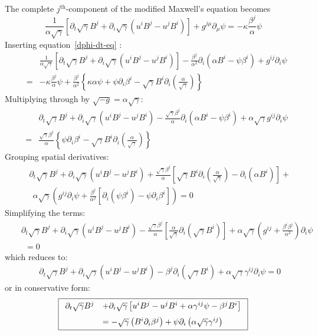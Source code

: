 \documentclass[11pt,preprint]{aastex}
\newcommand{\beq}[1]{\begin{equation} #1 \end{equation}}
\newcommand{\beqa}[1]{\begin{eqnarray} #1 \end{eqnarray}}
\begin{document}
The complete $j^\mathrm{th}$-component of the modified Maxwell's equation becomes
\beq{
\frac{1}{\alpha \sqrt{\gamma}} \left[ \partial_t \sqrt{\gamma}  B^j + 
\partial_i  \sqrt{\gamma} \left( u^i B^j - u^j B^i \right) \right]
+ g^{j \mu} \partial_\mu \psi 
 =  -\kappa \frac{\beta^j}{\alpha} \psi  
}
Inserting equation~\ref{dphi-dt-eq} :
\beqa{
&& \frac{1}{\alpha \sqrt{\gamma}} \left[ \partial_t \sqrt{\gamma}  B^j + 
\partial_i  \sqrt{\gamma} \left( u^i B^j - u^j B^i \right) \right]
- \frac{\beta^j}{\alpha^2}\partial_i\left( \alpha B^i - \psi\beta^i \right) 
+ g^{i j} \partial_i \psi \\
& = & -\kappa \frac{\beta^j}{\alpha} \psi  + \frac{\beta^j}{\alpha^2} \left\{ \kappa \alpha \psi  +\psi\partial_i\beta^i-\sqrt{\gamma}B^i\partial_i\left(\frac{\alpha}{\sqrt{\gamma}}\right) \right\} 
}
Multiplying through by $\sqrt{-g}=\alpha\sqrt{\gamma}$:
\beqa{
&&\partial_t \sqrt{\gamma}  B^j + 
\partial_i  \sqrt{\gamma} \left( u^i B^j - u^j B^i \right) 
- \frac{\sqrt{\gamma}\beta^j}{\alpha}\partial_i \left(\alpha B^i - \psi\beta^i \right) 
+\alpha\sqrt{\gamma} g^{i j} \partial_i \psi \\
& = & \frac{\sqrt{\gamma}\beta^j}{\alpha} \left\{\psi\partial_i\beta^i-\sqrt{\gamma}B^i\partial_i\left(\frac{\alpha}{\sqrt{\gamma}}\right)  \right\} 
}
Grouping spatial derivatives:
\beqa{
&&\partial_t \sqrt{\gamma}  B^j + 
\partial_i  \sqrt{\gamma} \left( u^i B^j - u^j B^i \right) 
+\frac{\sqrt{\gamma}\beta^j}{\alpha}\left[  \sqrt{\gamma}B^i\partial_i\left(\frac{\alpha}{\sqrt{\gamma}}\right)-\partial_i(\alpha B^i)\right]
+\nonumber\\
&&~~\alpha\sqrt{\gamma}\left( g^{i j} \partial_i \psi+\frac{\beta^j}{\alpha^2}[\partial_i(\psi\beta^i)-\psi\partial_i\beta^i]\right)
=  0
}
Simplifying the terms:
\beqa{
&&\partial_t \sqrt{\gamma}  B^j + 
\partial_i  \sqrt{\gamma} \left( u^i B^j - u^j B^i \right) 
-\frac{\sqrt{\gamma}\beta^j}{\alpha}\left[ \frac{\alpha}{\sqrt{\gamma}}\partial_i(\sqrt{\gamma}B^i)\right]
+\alpha\sqrt{\gamma}\left( g^{i j} +\frac{\beta^i\beta^j}{\alpha^2}\right)\partial_i\psi\nonumber
\\&&~~= 0
}
which reduces to:
\beqa{
&&\partial_t \sqrt{\gamma}  B^j + 
\partial_i  \sqrt{\gamma} \left( u^i B^j - u^j B^i \right) 
-\beta^j\partial_i(\sqrt{\gamma}B^i)
+\alpha\sqrt{\gamma} \gamma^{i j} \partial_i\psi=  0
}
or in conservative form:
\beq{
\fbox{$ \begin{array}{ll} 
 \partial_t \sqrt{\gamma}  B^j & + \partial_i  \sqrt{\gamma} \left[ u^i B^j - u^j B^i + \alpha \gamma^{i j} \psi 
- \beta^j B^i \right] 
\\[0.25cm] 
& = - \sqrt{\gamma} \left(  B^i \partial_i \beta^j  \right)
+ \psi \partial_i \left( \alpha \sqrt{\gamma} \gamma^{i j}  \right) 
\end{array} $}
}
\end{document}
